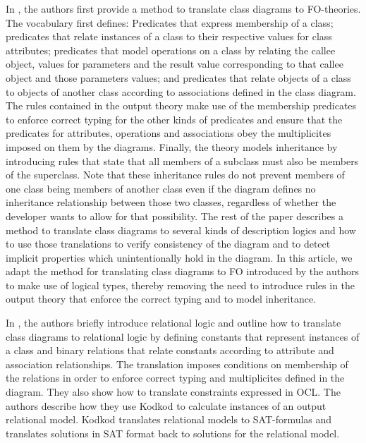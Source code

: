 \documentclass[conference]{IEEEtran}
\begin{document}
In \cite{BerardiDaniela2005RoUc}, the authors first provide a method to translate class diagrams to FO-theories. The vocabulary first defines: Predicates that express membership of a class; predicates that relate instances of a class to their respective values for class attributes; predicates that model operations on a class by relating the callee object, values for parameters and the result value corresponding to that callee object and those parameters values; and predicates that relate objects of a class to objects of another class according to associations defined in the class diagram. The rules contained in the output theory make use of the membership predicates to enforce correct typing for the other kinds of predicates and ensure that the predicates for attributes, operations and associations obey the multiplicites imposed on them by the diagrams. Finally, the theory models inheritance by introducing rules that state that all members of a subclass must also be members of the superclass. Note that these inheritance rules do not prevent members of one class being members of another class even if the diagram defines no inheritance relationship between those two classes, regardless of whether the developer wants to allow for that possibility. The rest of the paper describes a method to translate class diagrams to several kinds of description logics and how to use those translations to verify consistency of the diagram and to detect implicit properties which unintentionally hold in the diagram. In this article, we adapt the method for translating class diagrams to FO introduced by the authors to make use of logical types, thereby removing the need to introduce rules in the output theory that enforce the correct typing and to model inheritance.

In \cite{KuhlmannMirco2012FUaO}, the authors briefly introduce relational logic and outline how to translate class diagrams to relational logic by defining constants that represent instances of a class and binary relations that relate constants according to attribute and association relationships. The translation imposes conditions on membership of the relations in order to enforce correct typing and multiplicites defined in the diagram. They also show how to translate constraints expressed in OCL\cite{WarmerJosB1999Ocl:}. The authors describe how they use Kodkod\cite{10.1007/978-3-540-71209-1_49} to calculate instances of an output relational model. Kodkod translates relational models to SAT-formulas and translates solutions in SAT format back to solutions for the relational model.
\end{document}
